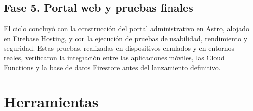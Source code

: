 \begin{large}
\subsection*{Fase 5. Portal web y pruebas finales}

El ciclo concluyó con la construcción del portal administrativo en Astro, alojado en Firebase Hosting, y con la ejecución de pruebas de usabilidad, rendimiento y seguridad. Estas pruebas, realizadas en dispositivos emulados y en entornos reales, verificaron la integración entre las aplicaciones móviles, las Cloud Functions y la base de datos Firestore antes del lanzamiento definitivo.

\end{large}

\section{Herramientas}

